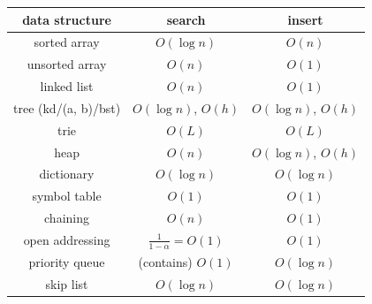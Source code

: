 \documentclass[10pt, landscape]{article}
\makeatletter
\newenvironment{tightcenter}{%
  \setlength\topsep{0pt}
  \setlength\parskip{0pt}
  \begin{center}
}{%
  \end{center}
}
\renewcommand{\section}{\@startsection{section}{1}{0mm}%
                                {-1ex plus -.5ex minus -.2ex}%
                                {0.5ex plus .2ex}%
                                {\normalfont\large\bfseries}}
\let\then\rightarrow
\makeatother
\begin{document}
\begin{multicols}{4}
\begin{tightcenter}
\begin{tabular}{| c | c | c |}
    \textbf{data structure} & \textbf{search} & \textbf{insert}\\\hline
    sorted array & $O(\log n)$ & $O(n)$ \\\hline
    unsorted array & $O(n)$ & $O(1)$ \\\hline
    linked list & $O(n)$ & $O(1)$ \\\hline
    tree (kd/(a, b)/bst) & $O(\log n)$, $O(h)$ & $O(\log n)$, $O(h)$ \\\hline
    trie & $O(L)$ & $O(L)$ \\\hline
    heap & $O(n)$ & $O(\log n)$, $O(h)$ \\\hline
    dictionary & $O(\log n)$ & $O(\log n)$ \\\hline
    symbol table & $O(1)$ & $O(1)$ \\\hline
    chaining & $O(n)$ & $O(1)$ \\\hline
    open addressing & $\frac{1}{1-\alpha} = O(1)$ & $O(1)$ \\\hline
    priority queue & (contains) $O(1)$ & $O(\log n)$ \\\hline
    skip list & $O(\log n)$ & $O(\log n)$ \\\hline
\end{tabular}

\end{tightcenter}
\end{multicols}
\end{document}
